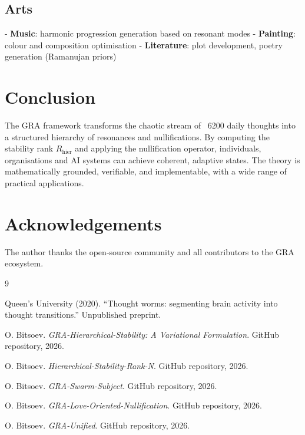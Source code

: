 \documentclass[12pt,a4paper]{article}
\begin{document}
\subsection{Arts}
- \textbf{Music}: harmonic progression generation based on resonant modes
- \textbf{Painting}: colour and composition optimisation
- \textbf{Literature}: plot development, poetry generation (Ramanujan priors)

\section{Conclusion}

The GRA framework transforms the chaotic stream of ~6200 daily thoughts into a structured hierarchy of resonances and nullifications. By computing the stability rank $R_{\text{hier}}$ and applying the nullification operator, individuals, organisations and AI systems can achieve coherent, adaptive states. The theory is mathematically grounded, verifiable, and implementable, with a wide range of practical applications.

\section*{Acknowledgements}

The author thanks the open‑source community and all contributors to the GRA ecosystem.


\begin{thebibliography}{9}

Queen's University (2020). ``Thought worms: segmenting brain activity into thought transitions.'' Unpublished preprint.

O. Bitsoev. \textit{GRA-Hierarchical-Stability: A Variational Formulation}. GitHub repository, 2026.

O. Bitsoev. \textit{Hierarchical-Stability-Rank-N}. GitHub repository, 2026.

O. Bitsoev. \textit{GRA-Swarm-Subject}. GitHub repository, 2026.

O. Bitsoev. \textit{GRA-Love-Oriented-Nullification}. GitHub repository, 2026.

O. Bitsoev. \textit{GRA-Unified}. GitHub repository, 2026.

\end{thebibliography}
\end{document}
